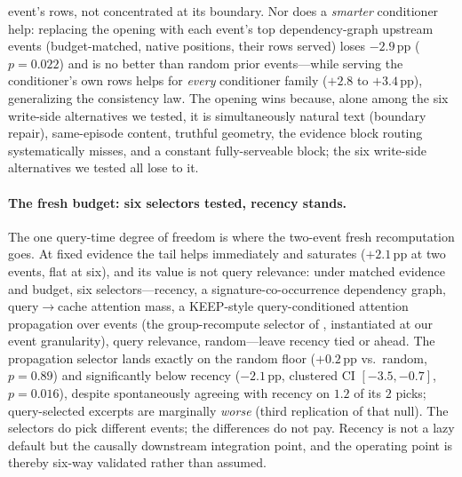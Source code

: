 \documentclass{article} %
\newcommand{\pp}{\,\mathrm{pp}}
\begin{document}
event's rows, not concentrated at its boundary. Nor does a \emph{smarter} conditioner
help: replacing the opening with each event's top dependency-graph upstream events
(budget-matched, native positions, their rows served) loses $-2.9\pp$ ($p{=}0.022$) and is
no better than random prior events---while serving the conditioner's own rows helps for
\emph{every} conditioner family ($+2.8$ to $+3.4\pp$), generalizing the consistency law.
The opening wins because, alone among the six write-side alternatives we tested, it is simultaneously natural text
(boundary repair), same-episode content, truthful geometry, the evidence block routing
systematically misses, and a constant fully-serveable block; the six write-side
alternatives we tested all lose to it.

\paragraph{The fresh budget: six selectors tested, recency stands.} The one query-time degree of freedom is
where the two-event fresh recomputation goes. At fixed evidence the tail helps immediately
and saturates ($+2.1\pp$ at two events, flat at six), and its value is not query relevance:
under matched evidence and budget, six selectors---recency, a signature-co-occurrence
dependency graph, query$\to$cache attention mass, a KEEP-style query-conditioned
attention propagation over events (the group-recompute selector of \citet{keep},
instantiated at our event granularity), query relevance, random---leave recency tied or
ahead. The propagation selector lands exactly on the random floor ($+0.2\pp$ vs.\ random,
$p{=}0.89$) and significantly below recency ($-2.1\pp$, clustered CI $[-3.5,-0.7]$,
$p{=}0.016$), despite spontaneously agreeing with recency on $1.2$ of its $2$ picks;
query-selected excerpts are marginally \emph{worse} (third replication of that null). The
selectors do pick different events; the differences do not pay. Recency is not a lazy
default but the causally downstream integration point, and the operating point is thereby
six-way validated rather than assumed.
\end{document}
